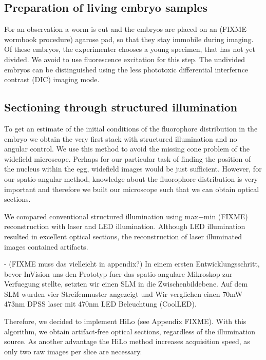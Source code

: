 \subsection{Preparation of living embryo samples}
For an observation a worm is cut and the embryos are placed on an (FIXME wormbook procedure)
agarose pad, so that they stay immobile during imaging. Of these
embryos, the experimenter chooses a young specimen, that has not yet
divided. We avoid to use fluorescence excitation for this step.
The undivided embryos can be distinguished using
the less phototoxic differential interfernce contrast (DIC) imaging
mode.

\subsection{Sectioning through structured illumination}
To get an estimate of the initial conditions of the fluorophore
distribution in the embryo we obtain the very first stack with
structured illumination and no angular control. We use this
method to avoid the missing cone problem of the
widefield microscope. Perhaps for our particular task of finding
the position of the nucleus within the egg, widefield images would be
just sufficient.  However, for our spatio-angular method, knowledge
about the fluorophore distribution is very important and therefore we
built our microscope such that we can obtain optical sections.

We compared conventional structured illumination using max$-$min
(FIXME) reconstruction with laser and LED illumination. Although LED
illumination resulted in excellent optical sections, the reconstruction of
laser illuminated images contained artifacts.

{\color{red}
- (FIXME muss das vielleicht in appendix?) In einem ersten
Entwicklungsschritt, bevor InVision uns den Prototyp fuer das
spatio-angulare Mikroskop zur Verfuegung stellte, setzten wir einen
SLM in die Zwischenbildebene. Auf dem SLM wurden vier Streifenmuster
angezeigt und Wir verglichen einen 70mW 473nm DPSS laser mit 470nm LED
Beleuchtung (CoolLED).}

Therefore, we decided to implement HiLo (see Appendix FIXME). With
this algorithm, we obtain artifact-free optical sections, regardless
of the illumination source. As another advantage the HiLo method
increases acquisition speed, as only two raw images per slice are
necessary.


